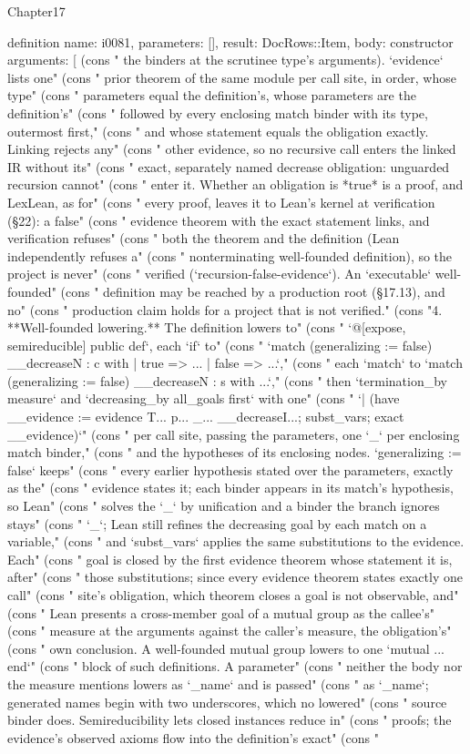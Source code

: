 \begin{lexlean}{Chapter17}
\begin{semanticmodule}
definition{
  name: i0081,
  parameters: [],
  result: DocRows::Item,
  body: constructor{
    arguments: [
      (cons "   the binders at the scrutinee type's arguments). `evidence` lists one" (cons "   prior theorem of the same module per call site, in order, whose type" (cons "   parameters equal the definition's, whose parameters are the definition's" (cons "   followed by every enclosing match binder with its type, outermost first," (cons "   and whose statement equals the obligation exactly. Linking rejects any" (cons "   other evidence, so no recursive call enters the linked IR without its" (cons "   exact, separately named decrease obligation: unguarded recursion cannot" (cons "   enter it. Whether an obligation is *true* is a proof, and LexLean, as for" (cons "   every proof, leaves it to Lean's kernel at verification (§22): a false" (cons "   evidence theorem with the exact statement links, and verification refuses" (cons "   both the theorem and the definition (Lean independently refuses a" (cons "   nonterminating well-founded definition), so the project is never" (cons "   verified (`recursion-false-evidence`). An `executable` well-founded" (cons "   definition may be reached by a production root (§17.13), and no" (cons "   production claim holds for a project that is not verified." (cons "4. **Well-founded lowering.** The definition lowers to" (cons "   `@[expose, semireducible] public def`, each `if` to" (cons "   `match (generalizing := false) __decreaseN : c with | true => ... | false => ...`," (cons "   each `match` to `match (generalizing := false) __decreaseN : s with ...`," (cons "   then `termination_by measure` and `decreasing_by all_goals first` with one" (cons "   `| (have __evidence := evidence T... p... _... __decreaseI...; subst_vars; exact __evidence)`" (cons "   per call site, passing the parameters, one `_` per enclosing match binder," (cons "   and the hypotheses of its enclosing nodes. `generalizing := false` keeps" (cons "   every earlier hypothesis stated over the parameters, exactly as the" (cons "   evidence states it; each binder appears in its match's hypothesis, so Lean" (cons "   solves the `_` by unification and a binder the branch ignores stays" (cons "   `_`; Lean still refines the decreasing goal by each match on a variable," (cons "   and `subst_vars` applies the same substitutions to the evidence. Each" (cons "   goal is closed by the first evidence theorem whose statement it is, after" (cons "   those substitutions; since every evidence theorem states exactly one call" (cons "   site's obligation, which theorem closes a goal is not observable, and" (cons "   Lean presents a cross-member goal of a mutual group as the callee's" (cons "   measure at the arguments against the caller's measure, the obligation's" (cons "   own conclusion. A well-founded mutual group lowers to one `mutual ... end`" (cons "   block of such definitions. A parameter" (cons "   neither the body nor the measure mentions lowers as `_name` and is passed" (cons "   as `_name`; generated names begin with two underscores, which no lowered" (cons "   source binder does. Semireducibility lets closed instances reduce in" (cons "   proofs; the evidence's observed axioms flow into the definition's exact" (cons "   }}
\end{semanticmodule}
\end{lexlean}
